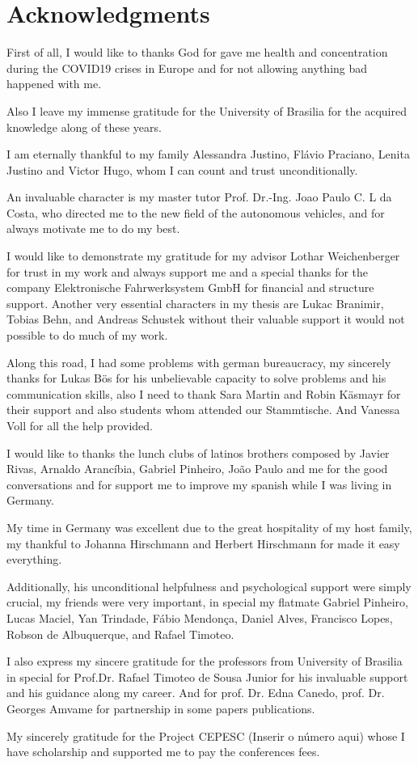 \chapter*{Acknowledgments}

First of all, I would like to thanks God for gave me health and concentration during the COVID19 crises in Europe and for not allowing anything bad happened with me.

Also I leave my immense gratitude for the University of Brasilia for the acquired knowledge along of these years.


I am eternally thankful to my family Alessandra Justino, Flávio Praciano, Lenita Justino and Victor Hugo, whom I can count and trust unconditionally.

An invaluable character is my master tutor Prof. Dr.-Ing. Joao Paulo C. L da Costa, who directed me to the new field of the autonomous vehicles, and for always motivate me to do my best.

I would like to demonstrate my gratitude for my advisor Lothar Weichenberger for trust in my work and always support me and a special thanks for the company Elektronische Fahrwerksystem GmbH for financial and structure support. Another very essential characters in my thesis are Lukac Branimir, Tobias Behn, and Andreas Schustek without their valuable support it would not possible to do much of my work.

Along this road, I had some problems with german bureaucracy, my sincerely thanks for Lukas Bös for his unbelievable capacity to solve problems and his communication skills, also I need to thank Sara Martin and Robin Käsmayr for their support and also students whom attended our Stammtische. And Vanessa Voll for all the help provided.

I would like to thanks the lunch clubs of latinos brothers composed by Javier Rivas, Arnaldo Arancíbia, Gabriel Pinheiro, João Paulo and me for the good conversations and for support me to improve my spanish while I was living in Germany.

My time in Germany was excellent due to the great hospitality of my host family, my thankful to Johanna Hirschmann and Herbert Hirschmann for made it easy everything. 

Additionally, his unconditional helpfulness and psychological support were simply
crucial, my friends were very important, in special my flatmate Gabriel Pinheiro, Lucas Maciel, Yan Trindade, Fábio Mendonça, Daniel Alves, Francisco Lopes, Robson de Albuquerque, and Rafael Timoteo. 

I also express my sincere gratitude for the professors from University of Brasilia in special for Prof.Dr. Rafael Timoteo de Sousa Junior for his invaluable support and his guidance along my career. And for prof. Dr. Edna Canedo, prof. Dr. Georges Amvame for partnership in some papers publications.

My sincerely gratitude for the Project CEPESC (Inserir o número aqui) whose I have scholarship and supported me to pay the conferences fees.